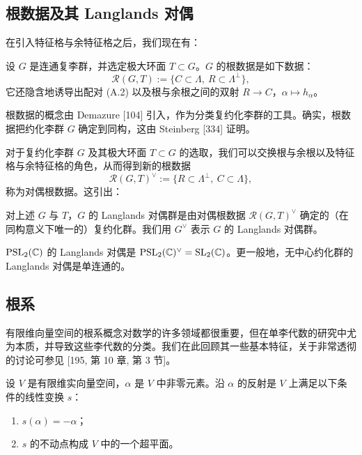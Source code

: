 \subsection{根数据及其 Langlands 对偶}

在引入特征格与余特征格之后，我们现在有：

\begin{definition}[A.10] 设 $G$ 是连通复李群，并选定极大环面 $T\subset G$。$G$ 的根数据是如下数据：
\[
\mathcal{R}(G,T):=\{C\subset\Lambda,\ R\subset\Lambda^{\perp}\},
\]
它还隐含地诱导出配对 (A.2) 以及根与余根之间的双射 $R\to C$，$\alpha\mapsto h_\alpha$。
\end{definition}

根数据的概念由 Demazure [104] 引入，作为分类复约化李群的工具。确实，根数据把约化李群 $G$ 确定到同构，这由 Steinberg [334] 证明。

对于复约化李群 $G$ 及其极大环面 $T\subset G$ 的选取，我们可以交换根与余根以及特征格与余特征格的角色，从而得到新的根数据
\[
\mathcal{R}(G,T)^{\vee}:=\{R\subset\Lambda^{\perp},\ C\subset\Lambda\},
\]
称为对偶根数据。这引出：

\begin{definition}[A.11] 对上述 $G$ 与 $T$，$G$ 的 Langlands 对偶群是由对偶根数据 $\mathcal{R}(G,T)^{\vee}$ 确定的（在同构意义下唯一的）复约化群。我们用 $G^{\vee}$ 表示 $G$ 的 Langlands 对偶群。
\end{definition}

\begin{example}[A.12] $\operatorname{PSL}_2(\mathbb{C})$ 的 Langlands 对偶是 $\operatorname{PSL}_2(\mathbb{C})^{\vee}=\operatorname{SL}_2(\mathbb{C})$。更一般地，无中心约化群的 Langlands 对偶是单连通的。
\end{example}


\subsection{根系}

有限维向量空间的根系概念对数学的许多领域都很重要，但在单李代数的研究中尤为本质，并导致这些李代数的分类。我们在此回顾其一些基本特征，关于非常透彻的讨论可参见 [195, 第 10 章, 第 3 节]。

\begin{definition}[A.13] 设 $V$ 是有限维实向量空间，$\alpha$ 是 $V$ 中非零元素。沿 $\alpha$ 的反射是 $V$ 上满足以下条件的线性变换 $s$：
\begin{enumerate}
\item $s(\alpha)=-\alpha$；
\item $s$ 的不动点构成 $V$ 中的一个超平面。
\end{enumerate}
\end{definition}

